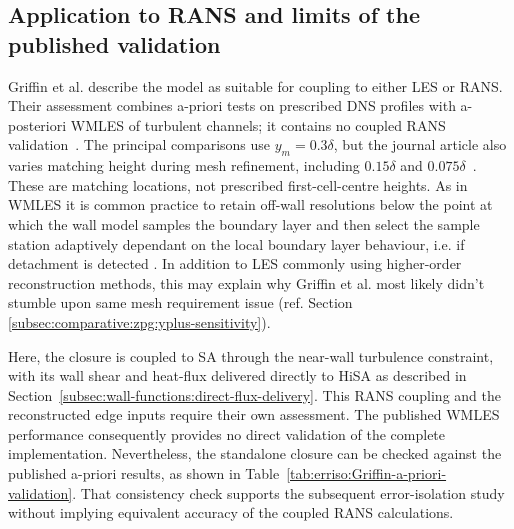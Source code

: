 \subsection{Application to RANS and limits of the published validation}
\label{subsec:wall-functions:griffin:validation-scope}

Griffin et al. describe the model as suitable for coupling to either LES or RANS. Their assessment combines a-priori tests on prescribed DNS profiles with a-posteriori WMLES of turbulent channels; it contains no coupled RANS validation~\cite[Sections~3--5]{griffin2023WF}. The principal comparisons use \(y_m=0.3\delta\), but the journal article also varies matching height during mesh refinement, including \(0.15\delta\) and \(0.075\delta\)~\cite[Section~4.1]{griffin2023WF}. These are matching locations, not prescribed first-cell-centre heights. As in WMLES it is common practice to retain off-wall resolutions below the point at which the wall model samples the boundary layer and then select the sample station adaptively dependant on the local boundary layer behaviour, i.e. if detachment is detected \cite{gao2026adaptive}. In addition to LES commonly using higher-order reconstruction methods, this may explain why Griffin et al. most likely didn't stumble upon  same mesh requirement issue (ref. Section \ref{subsec:comparative:zpg:yplus-sensitivity}).
\par\medskip

Here, the closure is coupled to SA through the near-wall turbulence constraint, with its wall shear and heat-flux delivered directly to HiSA as described in Section~\ref{subsec:wall-functions:direct-flux-delivery}. This RANS coupling and the reconstructed edge inputs require their own assessment. The published WMLES performance consequently provides no direct validation of the complete implementation. Nevertheless, the standalone closure can be checked against the published a-priori results, as shown in Table~\ref{tab:erriso:Griffin-a-priori-validation}. That consistency check supports the subsequent error-isolation study without implying equivalent accuracy of the coupled RANS calculations.
